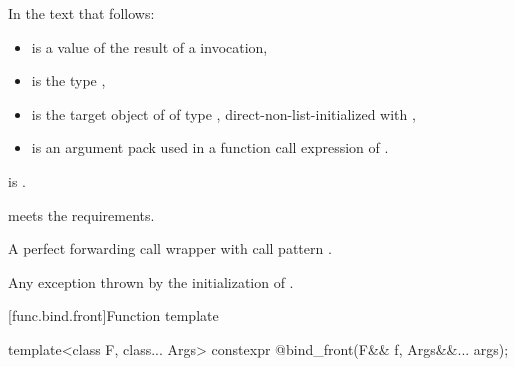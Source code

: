 \begin{itemdescr}
\pnum
In the text that follows:
\begin{itemize}
\item {} is a value of the result of a  invocation,
\item {} is the type ,
\item {} is the target object of 
  of type ,
  direct-non-list-initialized with ,
\item {} is an argument pack
  used in a function call expression of .
\end{itemize}

\pnum
\mandates
{}
is .

\pnum
\expects
{} meets the  requirements.

\pnum
\returns
A perfect forwarding call wrapper 
with call pattern .

\pnum
\throws
Any exception thrown by the initialization of .
\end{itemdescr}

[func.bind.front]{Function template }

%
\begin{itemdecl}
template<class F, class... Args>
  constexpr @\unspec@ bind_front(F&& f, Args&&... args);
\end{itemdecl}

